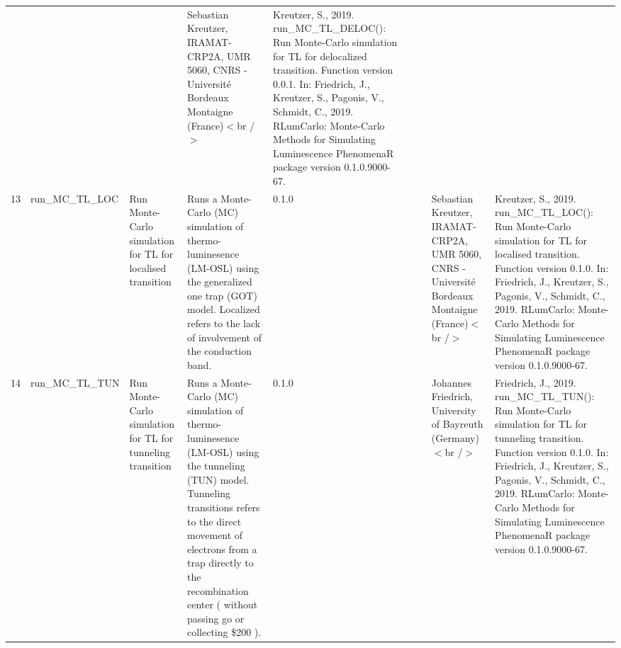 \begin{table}[ht]
\begin{tabular}{rllllllll}
 &  &  & Sebastian Kreutzer, IRAMAT-CRP2A, UMR 5060, CNRS - Université Bordeaux Montaigne (France)$<$br /$>$ & Kreutzer, S., 2019. run\_MC\_TL\_DELOC(): Run Monte-Carlo simulation for TL for delocalized transition. Function version 0.0.1. In: Friedrich, J., Kreutzer, S., Pagonis, V., Schmidt, C., 2019. RLumCarlo: Monte-Carlo Methods for Simulating Luminescence PhenomenaR package version 0.1.0.9000-67. 
 \\ 
  13 & run\_MC\_TL\_LOC & Run Monte-Carlo simulation for TL for localised transition & Runs a Monte-Carlo (MC) simulation of thermo-luminesence (LM-OSL) using the generalized one trap (GOT) model. Localized refers to the lack of involvement of the conduction band. & 0.1.0
 &  &  & Sebastian Kreutzer, IRAMAT-CRP2A, UMR 5060, CNRS - Université Bordeaux Montaigne (France)$<$br /$>$ & Kreutzer, S., 2019. run\_MC\_TL\_LOC(): Run Monte-Carlo simulation for TL for localised transition. Function version 0.1.0. In: Friedrich, J., Kreutzer, S., Pagonis, V., Schmidt, C., 2019. RLumCarlo: Monte-Carlo Methods for Simulating Luminescence PhenomenaR package version 0.1.0.9000-67. 
 \\ 
  14 & run\_MC\_TL\_TUN & Run Monte-Carlo simulation for TL for tunneling transition & Runs a Monte-Carlo (MC) simulation of thermo-luminesence (LM-OSL) using the tunneling (TUN) model. Tunneling transitions refers to the direct movement of electrons from a trap directly to the recombination center ( without passing go or collecting \$200 ). & 0.1.0
 &  &  & Johannes Friedrich, University of Bayreuth (Germany)$<$br /$>$ & Friedrich, J., 2019. run\_MC\_TL\_TUN(): Run Monte-Carlo simulation for TL for tunneling transition. Function version 0.1.0. In: Friedrich, J., Kreutzer, S., Pagonis, V., Schmidt, C., 2019. RLumCarlo: Monte-Carlo Methods for Simulating Luminescence PhenomenaR package version 0.1.0.9000-67. 
 \\ 
   \hline
\end{tabular}
\end{table}

